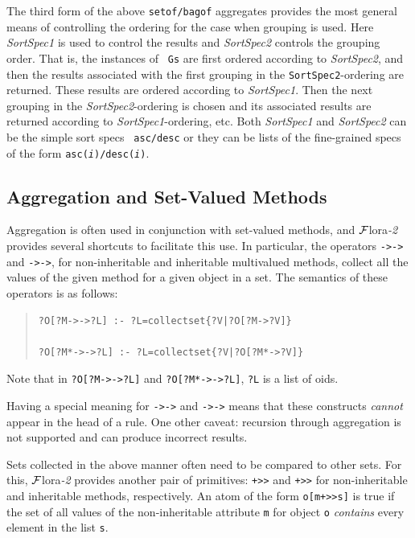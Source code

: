 \documentclass[11pt]{article}
\newcommand{\FLORA}{{\mbox{\sc ${\cal F}${lora}\rm\emph{-2}}}\xspace}
\begin{document}
The third form of the above {\tt setof/bagof} aggregates provides the most
general means of controlling the ordering for the case when grouping is
used. Here {\it SortSpec1} is used to control the results and {\it
  SortSpec2} controls the grouping order.  That is, the instances of {\tt
  Gs} are first ordered according to {\it SortSpec2}, and then the results
associated with the first grouping in the {\tt SortSpec2}-ordering are
returned. These results are ordered according to {\it SortSpec1}. Then the
next grouping in the \emph{SortSpec2}-ordering is chosen and its associated
results are returned according to {\it SortSpec1}-ordering, etc. 
Both {\it SortSpec1} and {\it SortSpec2} can be the simple sort specs {\tt
  asc/desc}  or they can be lists of the
fine-grained specs of the form
{\tt asc({\it i})/desc({\it i})}.


\subsection {Aggregation and Set-Valued Methods}

\index{{\tt ->->}}
\index{{\tt *->->}}
Aggregation is often used in conjunction with set-valued methods, and
\FLORA provides several shortcuts to facilitate this use.
In particular, the operators
{\tt ->->} and {\tt *->->}, for non-inheritable and
inheritable multivalued methods, collect all the values of the given
method for a given object in a set. The semantics of these operators is
as follows:

\begin{quote}
\begin{verbatim}
?O[?M->->?L] :- ?L=collectset{?V|?O[?M->?V]}

?O[?M*->->?L] :- ?L=collectset{?V|?O[?M*->?V]}
\end{verbatim}
\end{quote}

\noindent
Note that in {\tt ?O[?M->->?L]}  and {\tt ?O[?M*->->?L]}, {\tt ?L} is a list of oids.

Having a special meaning for {\tt ->->} and {\tt *->->} means that these
constructs \emph{cannot} appear in the head of a rule.
One other caveat: recursion through aggregation is not supported and can
produce incorrect results.



\index{\tt +>>}
\index{\tt *+>>}
Sets collected in the above manner often  need to be compared to other
sets. For this, \FLORA provides another pair of primitives: {\tt +>>} and
{\tt *+>>} for non-inheritable and inheritable methods, respectively.
An atom of the form {\tt o[m+>>s]} is true if the set of all values of the
non-inheritable attribute {\tt m} for object {\tt o} \emph{contains} every
element in the list {\tt s}. 
\end{document}
